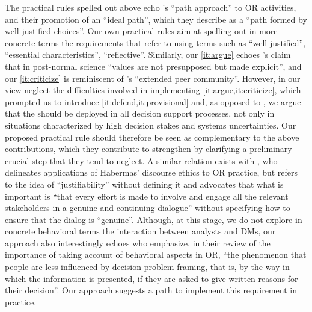 \documentclass[preprint, french, english, 11pt, authoryear]{elsarticle}%
\newcommand{\possessivecite}[1]{\citeauthor{#1}’s \citeyearpar{#1}}
\begin{document}
The practical rules spelled out above echo \possessivecite{lahtinen_why_2017} ``path approach'' to \ac{OR}
 activities, and their promotion of an ``ideal path'', which they describe as a ``path formed by well-justified choices''.
Our own practical rules aim at spelling out in more concrete terms the requirements that \citet{lahtinen_why_2017} refer to using terms such as ``well-justified'', ``essential characteristics'', ``reflective''.
Similarly, our \cref{it:argue} echoes \possessivecite{funtowicz_science_1993} claim that in post-normal science ``values are not presupposed but made explicit'', and our \cref{it:criticize} is reminiscent of \citeauthor{funtowicz_science_1993}’s ``extended peer community''.
However, in our view \citeauthor{funtowicz_science_1993} neglect the difficulties involved in implementing \cref{it:argue,it:criticize}, which prompted us to introduce \cref{it:defend,it:provisional} and, as opposed to \citeauthor{funtowicz_science_1993}, we argue that the  should be deployed in all decision support processes, 
not only in situations characterized by high decision stakes and systems uncertainties.
Our proposed practical rule should therefore be seen as complementary to the above contributions, which they contribute to strengthen by clarifying a preliminary crucial step that they tend to neglect.
A similar relation exists with \citet{mingers_ethics_2011}, who delineates applications of Habermas' discourse ethics to \ac{OR}
 practice, but refers to the idea of ``justifiability'' without defining it and 
advocates that what is important is ``that every effort is made to involve and engage all the relevant stakeholders in a genuine and continuing dialogue'' without specifying how to ensure that the dialog is ``genuine''.
Although, at this stage, we do not explore in concrete behavioral terms the interaction between analysts and \acp{DM}, 
our approach also interestingly echoes \citet{hamalainen_importance_2013} who emphasize, in their review of the importance of taking account of behavioral aspects in \ac{OR}, 
``the phenomenon that people are less influenced by decision problem framing, that is, by the way in which the information is presented, if they are asked to give written reasons for their decision''.
Our approach suggests a path to implement this requirement in practice.
\end{document}
